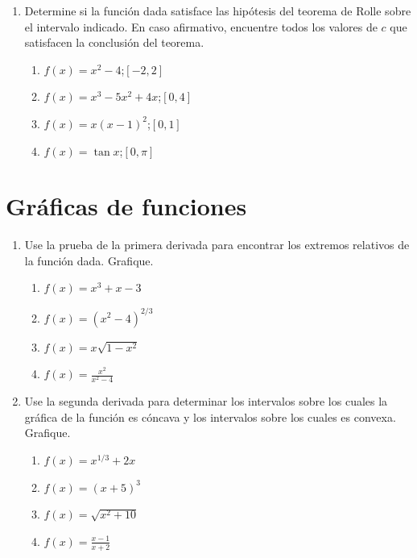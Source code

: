 \documentclass[11pt,a4paper,oneside]{article}\usepackage[]{graphicx}\usepackage[]{color}
\begin{document}
\begin{enumerate}
      \item Determine si la función dada satisface las hipótesis del teorema de Rolle sobre el intervalo indicado. En caso afirmativo, encuentre todos los valores de $c$ que satisfacen la conclusión del teorema.
      \begin{multicols}{2}
      \begin{enumerate}
            \item $f(x)=x^2-4$;\quad $[-2,2]$
            \item $f(x)=x^3-5x^2+4x$;\quad $[0,4]$
            \item $f(x)=x(x-1)^2$;\quad $[0,1]$
            \item $f(x)=\tan x$;\quad $[0,\pi]$
      \end{enumerate}
      \end{multicols}
\end{enumerate}

\section{Gráficas de funciones}

\begin{enumerate}
      \item Use la prueba de la primera derivada para encontrar los extremos relativos de la función dada.
      Grafique.
      \begin{multicols}{2}
      \begin{enumerate}
            \item $f(x)=x^3+x-3$
            \item $f(x)=(x^2-4)^{2/3}$
            \item $f(x)=x\sqrt{1-x^2}$
            \item $f(x)=\displaystyle \frac{x^2}{x^2-4}$
      \end{enumerate}
      \end{multicols}
      
      \item Use la segunda derivada para determinar los intervalos sobre los cuales la gráfica de la función es cóncava y los intervalos sobre los cuales es convexa. Grafique.
      \begin{multicols}{2}
      \begin{enumerate}
            \item $f(x)=x^{1/3}+2x$
            \item $f(x)=(x+5)^3$
            \item $f(x)=\sqrt{x^2+10}$
            \item $f(x)=\displaystyle \frac{x-1}{x+2}$
      \end{enumerate}
      \end{multicols}
\end{enumerate}
\end{document}
